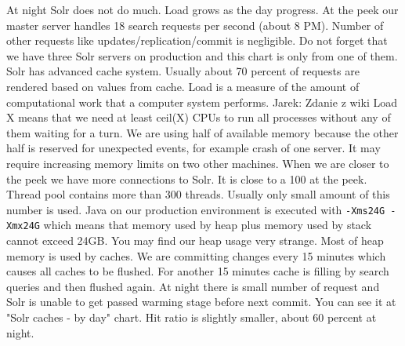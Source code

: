 \documentclass[10pt,a4paper]{article}
\newcommand{\jarek}[1]{\noindent\colorbox{myYellow}{Jarek: #1}}
\begin{document}
At night Solr does not do much. Load grows as the day progress. At the peek our master server handles 18 search requests per second (about 8 PM). Number of other requests like updates/replication/commit is negligible. Do not forget that we have three Solr servers on production and this chart is only from one of them. Solr has advanced cache system. Usually about 70 percent of requests are rendered based on values from cache. Load is a measure of the amount of computational work that a computer system performs. \jarek{Zdanie z wiki} Load X means that we need at least ceil(X) CPUs to run all processes without any of them waiting for a turn.  We are using half of available memory because the other half is reserved for unexpected events, for example crash of one server. It may require increasing memory limits on two other machines. When we are closer to the peek we have more connections to Solr. It is close to a 100 at the peek. Thread pool contains more than 300 threads. Usually only small amount of this number is used. Java on our production environment is executed with \verb|-Xms24G -Xmx24G| which means that memory used by heap plus memory used by stack cannot exceed 24GB. You may find our heap usage very strange. Most of heap memory is used by caches. We are committing changes every 15 minutes which causes all caches to be flushed. For another 15 minutes cache is filling by search queries and then flushed again. At night there is small number of request and Solr is unable to get passed warming stage before next commit. You can see it at "Solr caches - by day" chart. Hit ratio is slightly smaller, about 60 percent at night.




\end{document}
